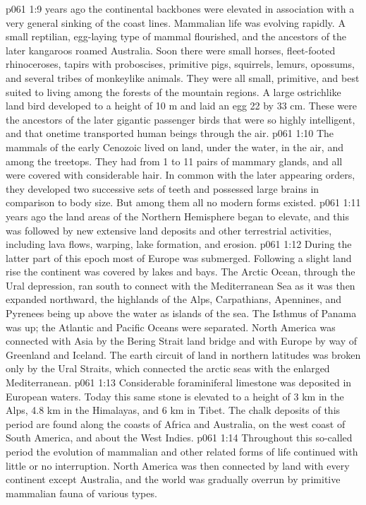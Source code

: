 \vs p061 1:9 \pc {} years ago the continental backbones were elevated in association with a very general sinking of the coast lines. Mammalian life was evolving rapidly. A small reptilian, egg\hyp{}laying type of mammal flourished, and the ancestors of the later kangaroos roamed Australia. Soon there were small horses, fleet\hyp{}footed rhinoceroses, tapirs with proboscises, primitive pigs, squirrels, lemurs, opossums, and several tribes of monkeylike animals. They were all small, primitive, and best suited to living among the forests of the mountain regions. A large ostrichlike land bird developed to a height of 10 m and laid an egg 22 by 33 cm. These were the ancestors of the later gigantic passenger birds that were so highly intelligent, and that onetime transported human beings through the air.
\vs p061 1:10 The mammals of the early Cenozoic lived on land, under the water, in the air, and among the treetops. They had from 1 to 11 pairs of mammary glands, and all were covered with considerable hair. In common with the later appearing orders, they developed two successive sets of teeth and possessed large brains in comparison to body size. But among them all no modern forms existed.
\vs p061 1:11 \pc {} years ago the land areas of the Northern Hemisphere began to elevate, and this was followed by new extensive land deposits and other terrestrial activities, including lava flows, warping, lake formation, and erosion.
\vs p061 1:12 During the latter part of this epoch most of Europe was submerged. Following a slight land rise the continent was covered by lakes and bays. The Arctic Ocean, through the Ural depression, ran south to connect with the Mediterranean Sea as it was then expanded northward, the highlands of the Alps, Carpathians, Apennines, and Pyrenees being up above the water as islands of the sea. The Isthmus of Panama was up; the Atlantic and Pacific Oceans were separated. North America was connected with Asia by the Bering Strait land bridge and with Europe by way of Greenland and Iceland. The earth circuit of land in northern latitudes was broken only by the Ural Straits, which connected the arctic seas with the enlarged Mediterranean.
\vs p061 1:13 Considerable foraminiferal limestone was deposited in European waters. Today this same stone is elevated to a height of 3 km in the Alps, 4.8 km in the Himalayas, and 6 km in Tibet. The chalk deposits of this period are found along the coasts of Africa and Australia, on the west coast of South America, and about the West Indies.
\vs p061 1:14 \pc Throughout this so\hyp{}called  period the evolution of mammalian and other related forms of life continued with little or no interruption. North America was then connected by land with every continent except Australia, and the world was gradually overrun by primitive mammalian fauna of various types.
